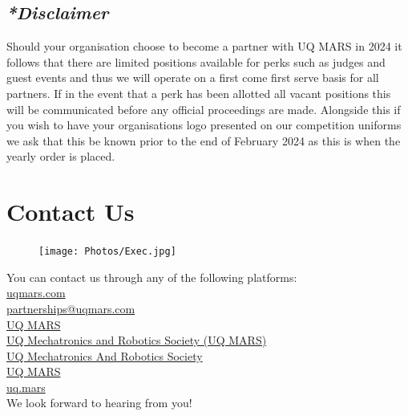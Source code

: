 \documentclass[a4paper,12pt]{report}
\begin{document}
\subsection{\textit{*Disclaimer}}
Should your organisation choose to become a partner with UQ MARS in 2024 it follows that there are limited positions available for perks such as judges and guest events and thus we will operate on a first come first serve basis for all partners. If in the event that a perk has been allotted all vacant positions this will be communicated before any official proceedings are made. Alongside this if you wish to have your organisations logo presented on our competition uniforms we ask that this be known prior to the end of February 2024 as this is when the yearly order is placed.

\newpage

\section*{Contact Us}
\begin{figure}[H]
    \centering
    \texttt{[image: Photos/Exec.jpg]}
\end{figure}

\large
\onehalfspacing
You can contact us through any of the following platforms: \\
\faLink{} \href{https://www.uqmars.com}{uqmars.com} \\
\faEnvelope{} \href{mailto:partnerships@uqmars.com}{partnerships@uqmars.com} \\
\faFacebookSquare{} \href{https://facebook.com/UQMARS}{UQ MARS} \\
\faLinkedinSquare{} \href{https://linkedin.com/company/uq-mars}{UQ Mechatronics and Robotics Society (UQ MARS)} \\
\faGithubSquare{} \href{https://github.com/uqmars}{UQ Mechatronics And Robotics Society} \\
\faYoutubePlay{} \href{https://www.youtube.com/channel/UCH3GjoKLL3R_1ayjkn9C78A}{UQ MARS} \\
\faInstagram{} \href{https://www.instagram.com/uq.mars/}{uq.mars} \\
We look forward to hearing from you!
\end{document}

